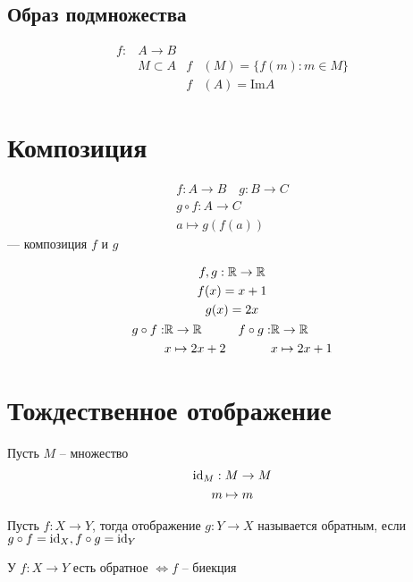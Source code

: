 \documentclass[main]{subfiles}
\begin{document}
\subsection{Образ подмножества}
\begin{align*}
    f: & A \to B     &   &                          \\
       & M \subset A & f & (M) = \{ f(m): m \in M\} \\
       &             & f & (A) = \text{Im}A
\end{align*}

\section{Композиция}


\begin{gather*}
    f: A \to B \quad g: B \to C\\
    g \circ  f:A \to C\\
    a \mapsto g(f(a))
\end{gather*} --- композиция $f$ и $g$

\begin{gather*}
    f, g: \mathbb{R} \to \mathbb{R}\\
    f(x) = x+1\\
    g(x) = 2x\\
    \begin{aligned}
        g \circ f : & \mathbb{R} \to \mathbb{R}      & f \circ g : & \mathbb{R} \to \mathbb{R}       \\
                    & x \mapsto 2x+2 &             & x \mapsto 2x +1
    \end{aligned}
\end{gather*}

\section{Тождественное отображение}
Пусть $M$ -- множество
\begin{gather*}
    \mathrm{id}_M : M \to M \\
    m \mapsto m
\end{gather*}

Пусть $f: X \to Y$, тогда отображение $g: Y \to X$ называется обратным, если
$g\circ f = \mathrm{id}_X, f \circ g = \mathrm{id}_Y$

\begin{theorem}
    У $f: X \to Y$ есть обратное $\Leftrightarrow f $ -- биекция
\end{theorem}
\end{document}
